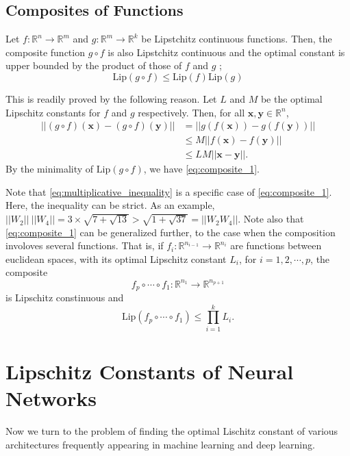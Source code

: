 \documentclass[11pt]{report}
\newcommand\bx{\ensuremath{\boldsymbol x}}
\newcommand\by{\ensuremath{\boldsymbol y}}
\newcommand\lip{\ensuremath{\text{Lip}}}
\begin{document}
\section{Composites of Functions}
Let \(f:\mathbb R^n\to\mathbb R^m\) and \(g:\mathbb R^m\to\mathbb R^k\) be Lipstchitz continuous functions.
Then, the composite function \(g\circ f\) is also Lipstchitz continuous and the optimal constant is upper bounded by the product of those of \(f\) and \(g\) ; 
\begin{equation}\label{eq:composite_1}
\lip(g\circ f)\le\lip(f)\lip(g)
\end{equation}

This is readily proved by the following reason.
Let \(L\) and \(M\) be the optimal Lipschitz constants for \(f\) and \(g\) respectively.
Then, for all \(\bx,\by\in\mathbb R^n\),
\begin{align*}
||(g\circ f)(\bx)-(g\circ f)(\by)||
&=||g(f(\bx))-g(f(\by))||\\
&\le M||f(\bx)-f(\by)||\\
&\le LM||\bx-\by||.
\end{align*}
By the minimality of \(\lip(g\circ f)\), we have \eqref{eq:composite_1}.

Note that \eqref{eq:multiplicative_inequality} is a specific case of \eqref{eq:composite_1}.
Here, the inequality can be strict.
As an example, \(||W_2||\:||W_4||=3\times\sqrt{7+\sqrt{13}}>\sqrt{1+\sqrt{37}}=||W_2W_4||\).
Note also that \eqref{eq:composite_1} can be generalized further, to the case when the composition involoves several functions.
That is, if \(f_i:\mathbb R^{n_{i-1}}\to\mathbb R^{n_i}\) are  functions between euclidean spaces, with its optimal Lipschitz constant \(L_i\), for \(i=1,2,\cdots,p\), the composite
\[f_p\circ\cdots\circ f_1:\mathbb R^{n_1}\to\mathbb R^{n_{p+1}}\]
is Lipschitz constinuous and
\begin{equation}\label{eq:composite_2}
\lip(f_p\circ\cdots\circ f_1)\le\prod_{i=1}^kL_i.
\end{equation}

\chapter{Lipschitz Constants of Neural Networks}

Now we turn to the problem of finding the optimal Lischitz constant of various architectures frequently appearing in machine learning and deep learning.
\end{document}

